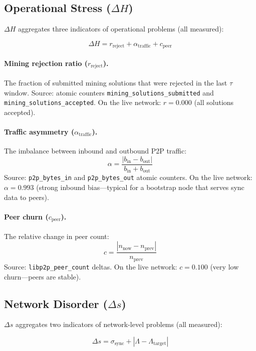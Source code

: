 \documentclass[11pt,a4paper]{article}
\begin{document}
\subsection{Operational Stress ($\Delta H$)}

$\Delta H$ aggregates three indicators of operational problems (\textcolor{measured}{all measured}):

\begin{equation}
\Delta H = r_{\text{reject}} + \alpha_{\text{traffic}} + c_{\text{peer}}
\end{equation}

\paragraph{Mining rejection ratio ($r_{\text{reject}}$).} The fraction of submitted mining solutions that were rejected in the last $\tau$ window. Source: atomic counters \texttt{mining\_solutions\_submitted} and \texttt{mining\_solutions\_accepted}. On the live network: $r = 0.000$ (all solutions accepted).

\paragraph{Traffic asymmetry ($\alpha_{\text{traffic}}$).} The imbalance between inbound and outbound P2P traffic:
\[
\alpha = \frac{|b_{\text{in}} - b_{\text{out}}|}{b_{\text{in}} + b_{\text{out}}}
\]
Source: \texttt{p2p\_bytes\_in} and \texttt{p2p\_bytes\_out} atomic counters. On the live network: $\alpha = 0.993$ (strong inbound bias---typical for a bootstrap node that serves sync data to peers).

\paragraph{Peer churn ($c_{\text{peer}}$).} The relative change in peer count:
\[
c = \frac{|n_{\text{now}} - n_{\text{prev}}|}{n_{\text{prev}}}
\]
Source: \texttt{libp2p\_peer\_count} deltas. On the live network: $c = 0.100$ (very low churn---peers are stable).

\subsection{Network Disorder ($\Delta s$)}

$\Delta s$ aggregates two indicators of network-level problems (\textcolor{measured}{all measured}):

\begin{equation}
\Delta s = \sigma_{\text{sync}} + |\Lambda - \Lambda_{\text{target}}|
\end{equation}
\end{document}
